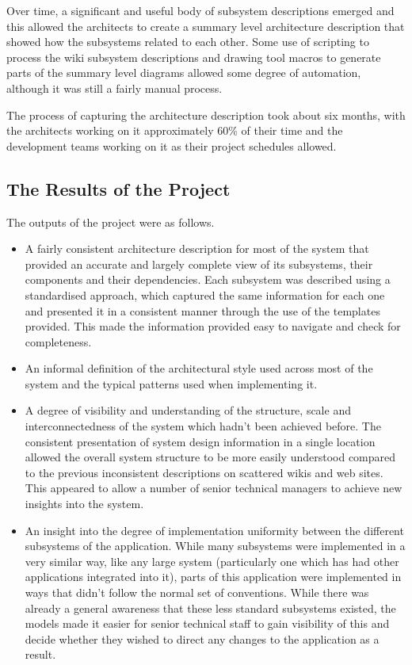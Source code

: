   Over time, a significant and useful body of subsystem descriptions emerged and this allowed the architects to create a summary level architecture description that showed how the subsystems related to each other.  Some use of scripting to process the wiki subsystem descriptions and drawing tool macros to generate parts of the summary level diagrams allowed some degree of automation, although it was still a fairly manual process.

   The process of capturing the architecture description took about six months, with the architects working on it approximately 60\% of their time and the development teams working on it as their project schedules allowed.

\subsection{The Results of the Project}

  The outputs of the project were as follows.

\begin{itemize}
\item A fairly consistent architecture description for most of the system that provided an accurate and largely complete view of its subsystems, their components and their dependencies.  Each subsystem was described using a standardised approach, which captured the same information for each one and presented it in a consistent manner through the use of the templates provided.  This made the information provided easy to navigate and check for completeness.

\item An informal definition of the architectural style used across most of the system and the typical patterns used when implementing it.

\item A degree of visibility and understanding of the structure, scale and interconnectedness of the system which hadn't been achieved before.  The consistent presentation of system design information in a single location allowed the overall system structure to be more easily understood compared to the previous inconsistent descriptions on scattered wikis and web sites.  This appeared to allow a number of senior technical managers to achieve new insights into the system.

\item An insight into the degree of implementation uniformity between the different subsystems of the application.  While many subsystems were implemented in a very similar way, like any large system (particularly one which has had other applications integrated into it), parts of this application were implemented in ways that didn't follow the normal set of conventions.  While there was already a general awareness that these less standard subsystems existed, the models made it easier for senior technical staff to gain visibility of this and decide whether they wished to direct any changes to the application as a result.

\end{itemize}

